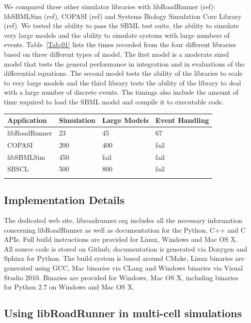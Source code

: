 \documentclass{bioinfo}
\begin{document}
We compared three other simulator libraries with libRoadRunner (ref): libSBMLSim (ref), COPASI (ref) and Systems Biology Simulation Core Library (ref). We tested the ability to pass the SBML test suite, the ability to simulate very large models and the ability to simulate systems with large numbers of events. Table~\ref{Tab:01} lists the times recorded from the four different libraries based on three different types of model. The first model is a moderate sized model that tests the general performance in integration and in evaluations of the differential equations. The second model tests the ability of the libraries to scale to very large models and the third library tests the ability of the library to deal with a large number of discrete events. The timings also include the amount of time required to load the SBML model and compile it to executable code.
%
\begin{table}[!t]
{\begin{tabular}{llll}\toprule
Application & Simulation & Large Models & Event Handling\\\midrule
libRoadRunner & 23 & 45 & 67  \\
COPASI & 200 & 400 & fail\\
libSBMLSim & 450 & fail & fail\\
SBSCL & 500 & 800 & fail \\ \botrule
\end{tabular}}{}
\end{table}

\subsection{Implementation Details}

The dedicated web site, libroadrunner.org includes all the necessary information concerning libRoadRunner as well as documentation for the Python, C++ and C APIs. Full build instructions are provided for Linux, Windows and Mac OS X. All source code is stored on Github; documentation is generated via Doxygen and Sphinx for Python. The build system is based around CMake, Linux binaries are generated using GCC, Mac binaries via CLang \citealp{Boffelli03} and Windows binaries via Visual Studio 2010. Binaries are provided for Windows, Mac OS X, including binaries for Python 2.7 on Windows and Mac OS X.


\subsection{Using libRoadRunner in multi-cell simulations}
\end{document}
